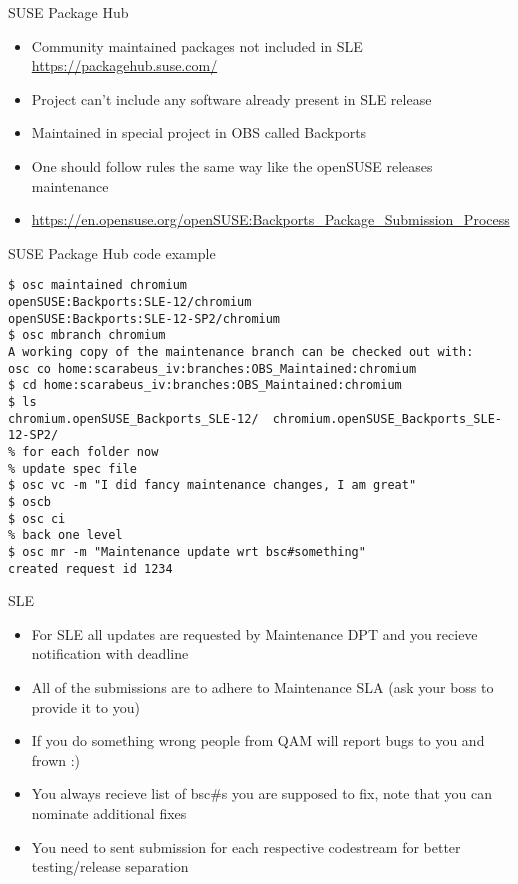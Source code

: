 \documentclass{beamer}
\begin{document}
\begin{frame}[t]{SUSE Package Hub}
	\begin{itemize}
	\item Community maintained packages not included in SLE \url{https://packagehub.suse.com/}
	\item Project can't include any software already present in SLE release
	\item Maintained in special project in OBS called Backports
	\item One should follow rules the same way like the openSUSE releases maintenance
	\item \url{https://en.opensuse.org/openSUSE:Backports\_Package\_Submission\_Process}
	\end{itemize}
\end{frame}

\begin{frame}[fragile]{SUSE Package Hub code example}
	\begin{scriptsize}
\begin{verbatim}
$ osc maintained chromium
openSUSE:Backports:SLE-12/chromium
openSUSE:Backports:SLE-12-SP2/chromium
$ osc mbranch chromium
A working copy of the maintenance branch can be checked out with:
osc co home:scarabeus_iv:branches:OBS_Maintained:chromium
$ cd home:scarabeus_iv:branches:OBS_Maintained:chromium
$ ls
chromium.openSUSE_Backports_SLE-12/  chromium.openSUSE_Backports_SLE-12-SP2/
% for each folder now
% update spec file
$ osc vc -m "I did fancy maintenance changes, I am great"
$ oscb
$ osc ci
% back one level
$ osc mr -m "Maintenance update wrt bsc#something"
created request id 1234
\end{verbatim}
	\end{scriptsize}
\end{frame}

\begin{frame}[t]{SLE}
	\begin{itemize}
	\item For SLE all updates are requested by Maintenance DPT and you recieve notification with deadline
	\item All of the submissions are to adhere to Maintenance SLA (ask your boss to provide it to you)
	\item If you do something wrong people from QAM will report bugs to you and frown :)
	\item You always recieve list of bsc\#s you are supposed to fix, note that you can nominate additional fixes
	\item You need to sent submission for each respective codestream for better testing/release separation
	\end{itemize}
\end{frame}
\end{document}
